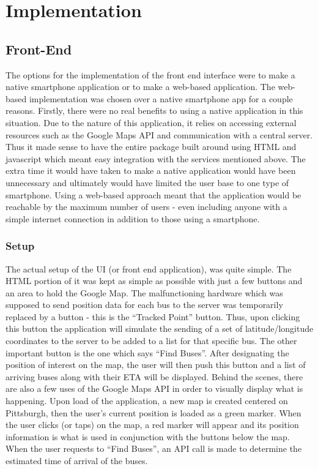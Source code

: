 \documentclass[pageno]{jpaper}
\begin{document}
\section{Implementation}
\subsection{Front-End}

The options for the implementation of the front end interface were to make a 
native smartphone application or to make a web-based application. The web-based 
implementation was chosen over a native smartphone app for a couple reasons. Firstly, 
there were no real benefits to using a native application in this situation. Due to the 
nature of this application, it relies on accessing external resources such as the Google 
Maps API and communication with a central server. Thus it made sense to have the 
entire package built around using HTML and javascript which meant easy integration 
with the services mentioned above. The extra time it would have taken to make a native 
application would have been unnecessary and ultimately would have limited the user 
base to one type of smartphone. Using a web-based approach meant that the 
application would be reachable by the maximum number of users - even including 
anyone with a simple internet connection in addition to those using a smartphone.

\subsubsection{Setup}
The actual setup of the UI (or front end application), was quite simple. The HTML
portion of it was kept as simple as possible with just a few buttons and an area to hold 
the Google Map. The malfunctioning hardware which was supposed to send position 
data for each bus to the server was temporarily replaced by a button - this is the 
“Tracked Point” button. Thus, upon clicking this button the application will simulate the 
sending of a set of latitude/longitude coordinates to the server to be added to a list for 
that specific bus. The other important button is the one which says “Find Buses”. After 
designating the position of interest on the map, the user will then push this button and a 
list of arriving buses along with their ETA will be displayed. Behind the scenes, there 
are also a few uses of the Google Maps API in order to visually display what is 
happening. Upon load of the application, a new map is created centered on Pittsburgh, 
then the user’s current position is loaded as a green marker. When the user clicks (or 
taps) on the map, a red marker will appear and its position information is what is used in 
conjunction with the buttons below the map. When the user requests to “Find Buses”, 
an API call is made to determine the estimated time of arrival of the buses.
\end{document}
